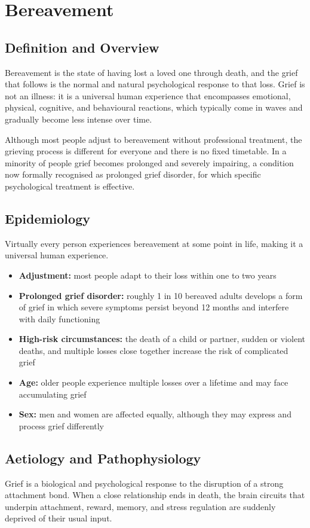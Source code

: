 \chapter{Bereavement}

\section*{Definition and Overview}
Bereavement is the state of having lost a loved one through death, and the grief that follows is the normal and natural psychological response to that loss. Grief is not an illness: it is a universal human experience that encompasses emotional, physical, cognitive, and behavioural reactions, which typically come in waves and gradually become less intense over time.

Although most people adjust to bereavement without professional treatment, the grieving process is different for everyone and there is no fixed timetable. In a minority of people grief becomes prolonged and severely impairing, a condition now formally recognised as prolonged grief disorder, for which specific psychological treatment is effective.

\section*{Epidemiology}
Virtually every person experiences bereavement at some point in life, making it a universal human experience.

\begin{itemize}
    \item \textbf{Adjustment:} most people adapt to their loss within one to two years
    \item \textbf{Prolonged grief disorder:} roughly 1 in 10 bereaved adults develops a form of grief in which severe symptoms persist beyond 12 months and interfere with daily functioning
    \item \textbf{High-risk circumstances:} the death of a child or partner, sudden or violent deaths, and multiple losses close together increase the risk of complicated grief
    \item \textbf{Age:} older people experience multiple losses over a lifetime and may face accumulating grief
    \item \textbf{Sex:} men and women are affected equally, although they may express and process grief differently
\end{itemize}

\section*{Aetiology and Pathophysiology}
Grief is a biological and psychological response to the disruption of a strong attachment bond. When a close relationship ends in death, the brain circuits that underpin attachment, reward, memory, and stress regulation are suddenly deprived of their usual input.

